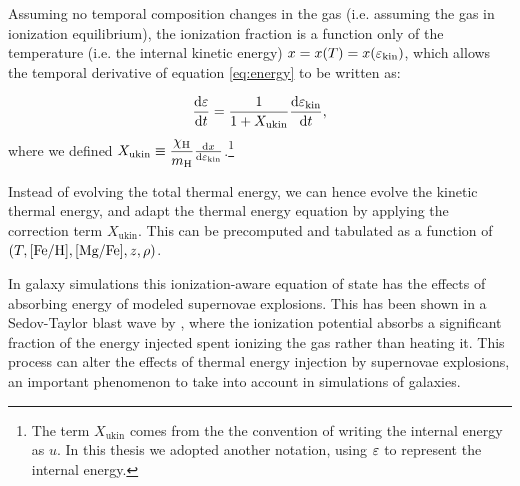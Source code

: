 Assuming no temporal composition changes in the gas (i.e. assuming the gas in ionization equilibrium), the ionization fraction is a function only of the temperature (i.e. the internal kinetic energy) $x = x(T) = x(\varepsilon_\text{kin})$, which allows the temporal derivative of equation \eqref{eq:energy} to be written as:

\begin{equation}
\dv{\varepsilon}{t} = \dfrac{1}{ 1 + X_\text{ukin}} \dv{\varepsilon_\text{kin}}{t},
\end{equation}
where we defined $X_\text{ukin} \equiv \dfrac{\chi_\text H}{m_\text H} \dv{x}{\varepsilon_\text{kin}}$.\footnote{The term $X_\text{ukin}$ comes from the the convention of writing the internal energy as $u$. In this thesis we adopted another notation, using $\varepsilon$ to represent the internal energy.}

Instead of evolving the total thermal energy, we can hence evolve the kinetic thermal energy, and adapt the thermal energy equation by applying the correction term $X_\text{ukin}$.
This can be precomputed and tabulated as a function of $(T, [\text{Fe}/\text{H}], [\text{Mg}/\text{Fe}], z, \rho)$.

In galaxy simulations this ionization-aware equation of state has the effects of absorbing energy of modeled supernovae explosions.
This has been shown in a Sedov-Taylor blast wave by \citet{Vandenbroucke2013}, where the ionization potential absorbs a significant fraction of the energy injected spent ionizing the gas rather than heating it.
This process can alter the effects of thermal energy injection by supernovae explosions, an important phenomenon to take into account in simulations of galaxies.


